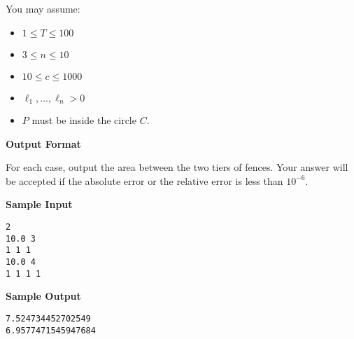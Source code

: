 You may assume:
\begin{itemize}
    \tightlist{}
    \item $1 \le T \le 100$
    \item $3 \le n \le 10$
    \item $10 \le c\le 1000$
    \item $\ell_1,\dots,\ell_n>0$
    \item $P$ must be inside the circle $C$.
\end{itemize}

\textbf{\large Output Format}

For each case, output the area between the two tiers of fences. 
Your answer will be accepted if the absolute error or the relative error is less than $10^{-6}$.

\textbf{\large Sample Input}

\begin{verbatim}
2
10.0 3
1 1 1
10.0 4
1 1 1 1
\end{verbatim}

\textbf{\large Sample Output}

\begin{verbatim}
7.524734452702549
6.9577471545947684
\end{verbatim}
